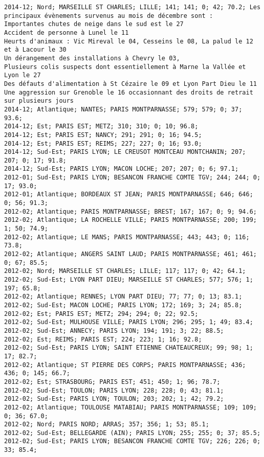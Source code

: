 \documentclass{article}
\begin{document}
\begin{Verbatim}[commandchars=\\\{\}]
2014-12; Nord; MARSEILLE ST CHARLES; LILLE; 141; 141; 0; 42; 70.2; Les principaux évènements survenus au mois de décembre sont :
Importantes chutes de neige dans le sud est le 27
Accident de personne à Lunel le 11
Heurts d'animaux : Vic Mireval le 04, Cesseins le 08, La palud le 12 et à Lacour le 30
Un dérangement des installations à Chevry le 03, 
Plusieurs colis suspects dont essentiellement à Marne la Vallée et Lyon le 27 
Des défauts d'alimentation à St Cézaire le 09 et Lyon Part Dieu le 11
Une aggression sur Grenoble le 16 occasionnant des droits de retrait sur plusieurs jours 
2014-12; Atlantique; NANTES; PARIS MONTPARNASSE; 579; 579; 0; 37; 93.6; 
2014-12; Est; PARIS EST; METZ; 310; 310; 0; 10; 96.8; 
2014-12; Est; PARIS EST; NANCY; 291; 291; 0; 16; 94.5; 
2014-12; Est; PARIS EST; REIMS; 227; 227; 0; 16; 93.0; 
2014-12; Sud-Est; PARIS LYON; LE CREUSOT MONTCEAU MONTCHANIN; 207; 207; 0; 17; 91.8; 
2014-12; Sud-Est; PARIS LYON; MACON LOCHE; 207; 207; 0; 6; 97.1; 
2012-01; Sud-Est; PARIS LYON; BESANCON FRANCHE COMTE TGV; 244; 244; 0; 17; 93.0; 
2012-01; Atlantique; BORDEAUX ST JEAN; PARIS MONTPARNASSE; 646; 646; 0; 56; 91.3; 
2012-02; Atlantique; PARIS MONTPARNASSE; BREST; 167; 167; 0; 9; 94.6; 
2012-02; Atlantique; LA ROCHELLE VILLE; PARIS MONTPARNASSE; 200; 199; 1; 50; 74.9; 
2012-02; Atlantique; LE MANS; PARIS MONTPARNASSE; 443; 443; 0; 116; 73.8; 
2012-02; Atlantique; ANGERS SAINT LAUD; PARIS MONTPARNASSE; 461; 461; 0; 67; 85.5; 
2012-02; Nord; MARSEILLE ST CHARLES; LILLE; 117; 117; 0; 42; 64.1; 
2012-02; Sud-Est; LYON PART DIEU; MARSEILLE ST CHARLES; 577; 576; 1; 197; 65.8; 
2012-02; Atlantique; RENNES; LYON PART DIEU; 77; 77; 0; 13; 83.1; 
2012-02; Sud-Est; MACON LOCHE; PARIS LYON; 172; 169; 3; 24; 85.8; 
2012-02; Est; PARIS EST; METZ; 294; 294; 0; 22; 92.5; 
2012-02; Sud-Est; MULHOUSE VILLE; PARIS LYON; 296; 295; 1; 49; 83.4; 
2012-02; Sud-Est; ANNECY; PARIS LYON; 194; 191; 3; 22; 88.5; 
2012-02; Est; REIMS; PARIS EST; 224; 223; 1; 16; 92.8; 
2012-02; Sud-Est; PARIS LYON; SAINT ETIENNE CHATEAUCREUX; 99; 98; 1; 17; 82.7; 
2012-02; Atlantique; ST PIERRE DES CORPS; PARIS MONTPARNASSE; 436; 436; 0; 145; 66.7; 
2012-02; Est; STRASBOURG; PARIS EST; 451; 450; 1; 96; 78.7; 
2012-02; Sud-Est; TOULON; PARIS LYON; 228; 228; 0; 43; 81.1; 
2012-02; Sud-Est; PARIS LYON; TOULON; 203; 202; 1; 42; 79.2; 
2012-02; Atlantique; TOULOUSE MATABIAU; PARIS MONTPARNASSE; 109; 109; 0; 36; 67.0; 
2012-02; Nord; PARIS NORD; ARRAS; 357; 356; 1; 53; 85.1; 
2012-02; Sud-Est; BELLEGARDE (AIN); PARIS LYON; 255; 255; 0; 37; 85.5; 
2012-02; Sud-Est; PARIS LYON; BESANCON FRANCHE COMTE TGV; 226; 226; 0; 33; 85.4; 

\end{Verbatim}
\end{document}
